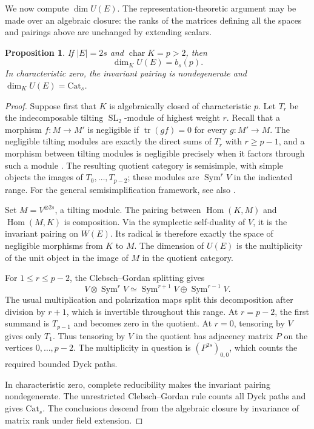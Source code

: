 \documentclass[11pt]{article}
\newtheorem{proposition}[theorem]{Proposition}
\theoremstyle{definition}
\theoremstyle{remark}
\numberwithin{equation}{section}
\DeclareMathOperator{\Sym}{Sym}
\DeclareMathOperator{\Hom}{Hom}
\DeclareMathOperator{\tr}{tr}
\DeclareMathOperator{\SL}{SL}
\newcommand{\kk}{K}
\newcommand{\Cat}{\mathrm{Cat}}
\begin{document}
We now compute $\dim U(E)$. The representation-theoretic argument may
be made over an algebraic closure: the ranks of the matrices defining
all the spaces and pairings above are unchanged by extending scalars.

\begin{proposition}\label{prop:rank}
If $|E|=2s$ and $\operatorname{char}\kk=p>2$, then
\[
 \dim_\kk U(E)=b_s(p).
\]
In characteristic zero, the invariant pairing is nondegenerate and
$\dim_\kk U(E)=\Cat_s$.
\end{proposition}

\begin{proof}
Suppose first that $\kk$ is algebraically closed of characteristic $p$.
Let $T_r$ be the indecomposable tilting $\SL_2$-module of highest weight
$r$. Recall that a morphism $f:M\to M'$ is negligible if
$\tr(gf)=0$ for every $g:M'\to M$. The negligible tilting modules are
exactly the direct sums of $T_r$ with $r\geq p-1$, and a morphism between
tilting modules is negligible precisely when it factors through such
a module \cite[Lemma~2.6 and Corollary~2.7]{BFRSW}. The resulting quotient
category is semisimple, with simple objects the images of
$T_0,\ldots,T_{p-2}$; these modules are $\Sym^rV$ in the indicated range.
For the general semisimplification framework, see also
\cite[Sections~1--2]{BEEO}.

Set $M=V^{\otimes 2s}$, a tilting module. The pairing between
$\Hom(\kk,M)$ and $\Hom(M,\kk)$ is composition. Via the symplectic
self-duality of $V$, it is the invariant pairing on $W(E)$. Its radical
is therefore exactly the space of negligible morphisms from $\kk$ to
$M$. The dimension of $U(E)$ is the multiplicity of the unit object in
the image of $M$ in the quotient category.

For $1\leq r\leq p-2$, the Clebsch--Gordan splitting gives
\begin{equation}\label{eq:cg}
 V\otimes\Sym^rV\simeq\Sym^{r+1}V\oplus\Sym^{r-1}V.
\end{equation}
The usual multiplication and polarization maps split this decomposition
after division by $r+1$, which is invertible throughout this range.
At $r=p-2$, the first summand is $T_{p-1}$ and becomes zero in the
quotient. At $r=0$, tensoring by $V$ gives only $T_1$.
Thus tensoring by $V$ in the quotient has adjacency matrix $P$ on the
vertices $0,\ldots,p-2$. The multiplicity in question is
$(P^{2s})_{0,0}$, which counts the required bounded Dyck paths.

In characteristic zero, complete reducibility makes the invariant
pairing nondegenerate. The unrestricted Clebsch--Gordan rule counts all
Dyck paths and gives $\Cat_s$. The conclusions descend from the
algebraic closure by invariance of matrix rank under field extension.
\end{proof}
\end{document}
